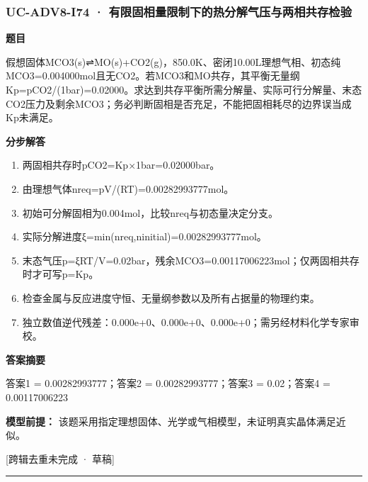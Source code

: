 \documentclass[UTF8,11pt,a4paper]{ctexart}
\begin{document}
\subsubsection*{UC-ADV8-I74 · 有限固相量限制下的热分解气压与两相共存检验}
\noindent\textbf{题目}\par
假想固体MCO3(s)⇌MO(s)+CO2(g)，850.0K、密闭10.00L理想气相、初态纯MCO3=0.004000mol且无CO2。若MCO3和MO共存，其平衡无量纲Kp=pCO2/(1bar)=0.02000。求达到共存平衡所需分解量、实际可行分解量、末态CO2压力及剩余MCO3；务必判断固相是否充足，不能把固相耗尽的边界误当成Kp未满足。\par
\medskip\noindent\textbf{分步解答}
\begin{enumerate}
\item 两固相共存时pCO2=Kp×1bar=0.02000bar。
\item 由理想气体nreq=pV/(RT)=0.00282993777mol。
\item 初始可分解固相为0.004mol，比较nreq与初态量决定分支。
\item 实际分解进度ξ=min(nreq,ninitial)=0.00282993777mol。
\item 末态气压p=ξRT/V=0.02bar，残余MCO3=0.00117006223mol；仅两固相共存时才可写p=Kp。
\item 检查金属与反应进度守恒、无量纲参数以及所有占据量的物理约束。
\item 独立数值逆代残差：0.000e+0、0.000e+0、0.000e+0；需另经材料化学专家审校。
\end{enumerate}
\noindent\textbf{答案摘要}\par
答案1 = 0.00282993777；答案2 = 0.00282993777；答案3 = 0.02；答案4 = 0.00117006223\par
\noindent\textbf{模型前提：}
该题采用指定理想固体、光学或气相模型，未证明真实晶体满足近似。\par
\noindent\textcolor{red!65!black}{[跨辑去重未完成 · 草稿]} \par
\medskip\hrule\medskip
{}
\end{document}

